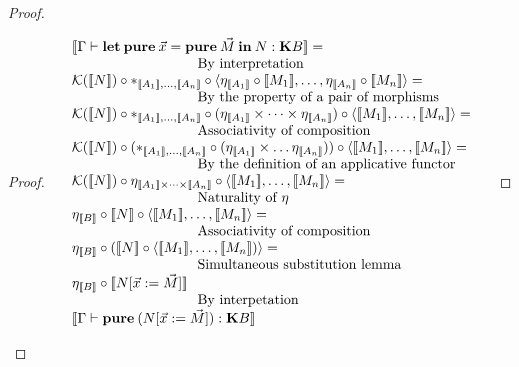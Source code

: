 \documentclass[a4paper]{article}
\begin{document}
\begin{proof}
\begin{proof}
\vspace{\baselineskip}

$\begin{array}{lll}
&[\![\Gamma \vdash {\bf let \: pure \:} \vec{x} = {\bf pure \:} \vec{M} {\: \bf in \:} N : {\bf K}B]\!] = & \\
&\text{\quad\quad\quad\quad\quad\quad\quad\quad\quad By interpretation}& \\
&\mathcal{K}([\![N]\!]) \circ \ast_{[\![A_1]\!],\dots,[\![A_n]\!]} \circ \langle \eta_{[\![A_1]\!]} \circ [\![M_1]\!],\dots,\eta_{[\![A_n]\!]} \circ [\![M_n]\!] \rangle = \\
&\text{\quad\quad\quad\quad\quad\quad\quad\quad\quad By the property of a pair of morphisms}& \\
&\mathcal{K}([\![N]\!]) \circ \ast_{[\![A_1]\!],\dots,[\![A_n]\!]} \circ (\eta_{[\![A_1]\!]} \times \dots \times \eta_{[\![A_n]\!]}) \circ \langle [\![M_1]\!], \dots, [\![M_n]\!]\rangle =& \\
&\text{\quad\quad\quad\quad\quad\quad\quad\quad\quad Associativity of composition}& \\
&\mathcal{K}([\![N]\!]) \circ (\ast_{[\![A_1]\!],\dots,[\![A_n]\!]} \circ (\eta_{[\![A_1]\!]} \times \dots \eta_{[\![A_n]\!]})) \circ \langle [\![M_1]\!], \dots, [\![M_n]\!] \rangle =& \\
&\text{\quad\quad\quad\quad\quad\quad\quad\quad\quad By the definition of an applicative functor}& \\
&\mathcal{K}([\![N]\!]) \circ \eta_{[\![A_1]\!] \times \dots \times [\![A_n]\!]} \circ \langle [\![M_1]\!], \dots, [\![M_n]\!] \rangle =& \\
&\text{\quad\quad\quad\quad\quad\quad\quad\quad\quad Naturality of $\eta$}& \\
&\eta_{[\![B]\!]} \circ [\![N]\!] \circ \langle [\![M_1]\!], \dots, [\![M_n]\!] \rangle =& \\
&\text{\quad\quad\quad\quad\quad\quad\quad\quad\quad Associativity of composition}& \\
&\eta_{[\![B]\!]} \circ ([\![N]\!] \circ \langle [\![M_1]\!], \dots, [\![M_n]\!]) \rangle =& \\
&\text{\quad\quad\quad\quad\quad\quad\quad\quad\quad Simultaneous substitution lemma}& \\
&\eta_{[\![B]\!]} \circ [\![N [\vec{x} := \vec{M}]]\!]& \\
&\text{\quad\quad\quad\quad\quad\quad\quad\quad\quad By interpetation}& \\
&[\![\Gamma \vdash {\bf pure \:} (N [\vec{x} := \vec{M}]) : {\bf K}B]\!]&
\end{array}$


\end{proof}
\end{proof}
\end{document}
